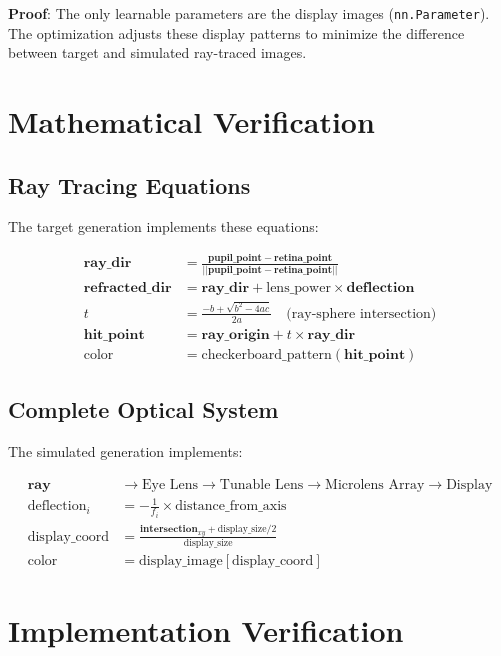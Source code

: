 \documentclass[11pt]{article}
\begin{document}
\textbf{Proof}: The only learnable parameters are the display images (\texttt{nn.Parameter}). The optimization adjusts these display patterns to minimize the difference between target and simulated ray-traced images.

\section{Mathematical Verification}

\subsection{Ray Tracing Equations}

The target generation implements these equations:

\begin{align}
\mathbf{ray\_dir} &= \frac{\mathbf{pupil\_point} - \mathbf{retina\_point}}{||\mathbf{pupil\_point} - \mathbf{retina\_point}||} \\
\mathbf{refracted\_dir} &= \mathbf{ray\_dir} + \text{lens\_power} \times \mathbf{deflection} \\
t &= \frac{-b + \sqrt{b^2 - 4ac}}{2a} \quad \text{(ray-sphere intersection)} \\
\mathbf{hit\_point} &= \mathbf{ray\_origin} + t \times \mathbf{ray\_dir} \\
\text{color} &= \text{checkerboard\_pattern}(\mathbf{hit\_point})
\end{align}

\subsection{Complete Optical System}

The simulated generation implements:

\begin{align}
\mathbf{ray} &\rightarrow \text{Eye Lens} \rightarrow \text{Tunable Lens} \rightarrow \text{Microlens Array} \rightarrow \text{Display} \\
\text{deflection}_i &= -\frac{1}{f_i} \times \text{distance\_from\_axis} \\
\text{display\_coord} &= \frac{\mathbf{intersection}_{xy} + \text{display\_size}/2}{\text{display\_size}} \\
\text{color} &= \text{display\_image}[\text{display\_coord}]
\end{align}

\section{Implementation Verification}
\end{document}
